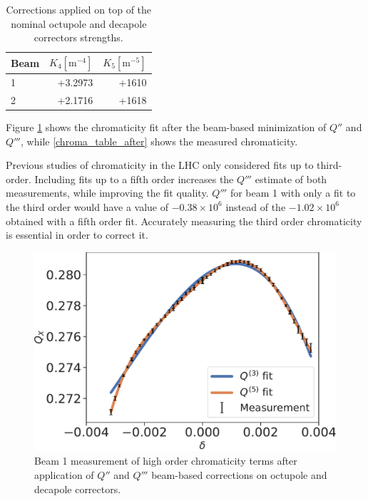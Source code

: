 \begin{table}[tbh]
    \centering
    \begin{tabular}{|l||r|r|}
    \hline
      Beam  &    $K_4 [\mathrm{m}^{-4}]$      &  $K_5 [\mathrm{m}^{-5}]$  \\ \hline\hline
        1   &  +3.2973     &  +1610   \\ \hline
        2   &   +2.1716    &  +1618   \\ \hline
    \end{tabular}
    \caption{Corrections applied on top of the nominal octupole and decapole correctors strengths.}
    \label{mcdo_values_corr}
\end{table}

Figure \ref{chroma_after_correction} shows the chromaticity fit after the beam-based minimization of $Q''$ and $Q'''$,
while \cref{chroma_table_after} shows the measured chromaticity.

Previous studies of chromaticity in the LHC only considered fits up to third-order.
Including fits up to a fifth order increases the $Q'''$ estimate of both measurements, while improving the fit quality. $Q'''$ for beam 1 with only a fit to the third order would have a value of $-0.38 \times 10^6$
instead of the $-1.02 \times 10^6$ obtained with a fifth order fit. 
Accurately measuring the third order chromaticity is essential in order to correct it.

\begin{figure}[tbh]
    \centering
    \includegraphics[width=1\columnwidth]{images/MOPL027_f3-1.pdf}
    \caption{Beam 1 measurement of high order chromaticity terms after application of $Q''$ and $Q'''$ 
             beam-based corrections on octupole and decapole correctors.}
    \label{chroma_after_correction}
\end{figure}

